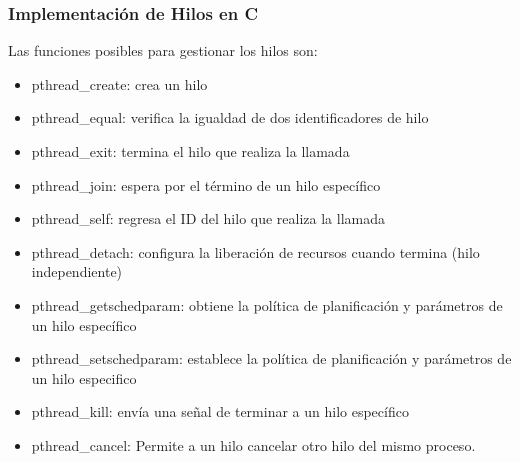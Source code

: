 \subsubsection{Implementación de Hilos en C}

Las funciones posibles para gestionar los hilos son:

\begin{itemize} \item   pthread\_create: crea un hilo \item   pthread\_equal: verifica la igualdad de dos identificadores de hilo \item   pthread\_exit: termina el hilo que realiza la llamada \item   pthread\_join: espera por el término de un hilo específico \item   pthread\_self: regresa el ID del hilo que realiza la llamada \item   pthread\_detach: configura la liberación de recursos cuando termina   (hilo independiente) \item   pthread\_getschedparam: obtiene la política de planificación y   parámetros de un hilo específico \item   pthread\_setschedparam: establece la política de planificación y   parámetros de un hilo especifico \item   pthread\_kill: envía una señal de terminar a un hilo específico \item   pthread\_cancel: Permite a un hilo cancelar otro hilo del mismo   proceso. \end{itemize}


